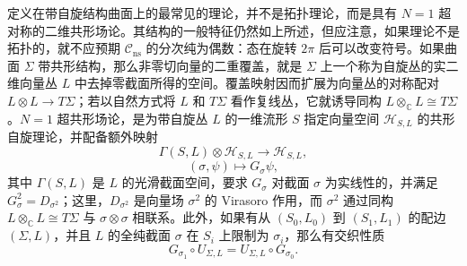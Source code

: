 \begin{example}
定义在带自旋结构曲面上的最常见的理论，并不是拓扑理论，而是具有 $N=1$ 超对称的二维共形场论。其结构的一般特征仍然如上所述，但应注意，如果理论不是拓扑的，就不应预期 $\mathcal{C}_{\mathrm{ns}}$ 的分次纯为偶数：态在旋转 $2\pi$ 后可以改变符号。如果曲面 $\Sigma$ 带共形结构，那么非零切向量的二重覆盖，就是 $\Sigma$ 上一个称为自旋丛的实二维向量丛 $L$ 中去掉零截面所得的空间。覆盖映射因而扩展为向量丛的对称配对 $L\otimes L\to T\Sigma$；若以自然方式将 $L$ 和 $T\Sigma$ 看作复线丛，它就诱导同构 $L\otimes_{\mathbb{C}}L\cong T\Sigma$。$N=1$ 超共形场论，是为带自旋丛 $L$ 的一维流形 $S$ 指定向量空间 $\mathcal{H}_{S,L}$ 的共形自旋理论，并配备额外映射
\begin{equation}\label{eq:2.20}
\Gamma(S,L)\otimes\mathcal{H}_{S,L}\longrightarrow\mathcal{H}_{S,L},
\end{equation}
\begin{equation}\label{eq:2.21}
(\sigma,\psi)\longmapsto G_\sigma\psi,
\end{equation}
其中 $\Gamma(S,L)$ 是 $L$ 的光滑截面空间，要求 $G_\sigma$ 对截面 $\sigma$ 为实线性的，并满足 $G_\sigma^2=D_{\sigma^2}$；这里，$D_{\sigma^2}$ 是向量场 $\sigma^2$ 的 Virasoro 作用，而 $\sigma^2$ 通过同构 $L\otimes_{\mathbb{C}}L\cong T\Sigma$ 与 $\sigma\otimes\sigma$ 相联系。此外，如果有从 $(S_0,L_0)$ 到 $(S_1,L_1)$ 的配边 $(\Sigma,L)$，并且 $L$ 的全纯截面 $\sigma$ 在 $S_i$ 上限制为 $\sigma_i$，那么有交织性质
\begin{equation}\label{eq:2.22}
G_{\sigma_1}\circ U_{\Sigma,L}=U_{\Sigma,L}\circ G_{\sigma_0}.
\end{equation}
\end{example}

